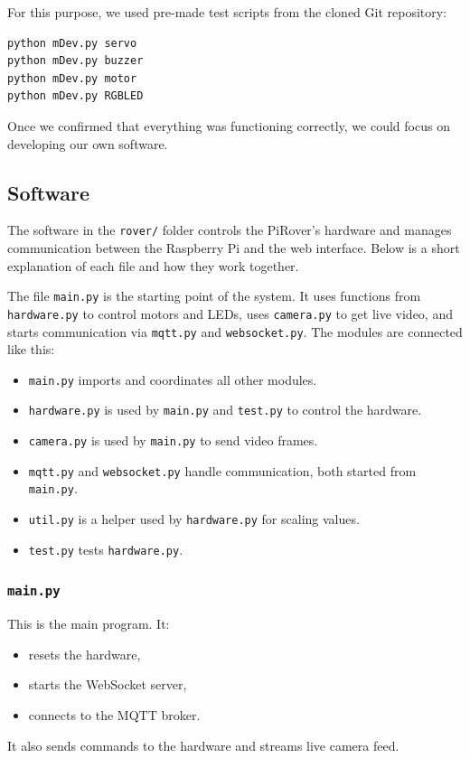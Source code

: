 For this purpose, we used pre-made test scripts from the cloned Git repository:
\begin{verbatim}
python mDev.py servo
python mDev.py buzzer
python mDev.py motor
python mDev.py RGBLED
\end{verbatim}

Once we confirmed that everything was functioning correctly, we could focus on developing our own software.


\subsection{Software}

The software in the \texttt{rover/} folder controls the PiRover's hardware and manages communication between the Raspberry Pi and the web interface. Below is a short explanation of each file and how they work together.

The file \texttt{main.py} is the starting point of the system. It uses functions from \texttt{hardware.py} to control motors and LEDs, uses \texttt{camera.py} to get live video, and starts communication via \texttt{mqtt.py} and \texttt{websocket.py}.
The modules are connected like this:
\begin{itemize}
    \item \texttt{main.py} imports and coordinates all other modules.
    \item \texttt{hardware.py} is used by \texttt{main.py} and \texttt{test.py} to control the hardware.
    \item \texttt{camera.py} is used by \texttt{main.py} to send video frames.
    \item \texttt{mqtt.py} and \texttt{websocket.py} handle communication, both started from \texttt{main.py}.
    \item \texttt{util.py} is a helper used by \texttt{hardware.py} for scaling values.
    \item \texttt{test.py} tests \texttt{hardware.py}.
\end{itemize}

\subsubsection*{\texttt{main.py}}
This is the main program. It:
\begin{itemize}
    \item resets the hardware,
    \item starts the WebSocket server,
    \item connects to the MQTT broker.
\end{itemize}
It also sends commands to the hardware and streams live camera feed.

